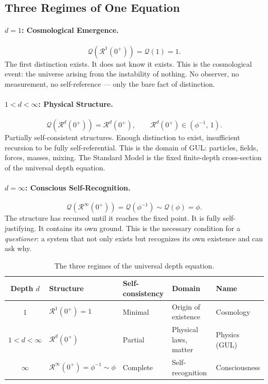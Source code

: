 \documentclass[11pt]{article}
\begin{document}
\subsection{Three Regimes of One Equation}

\paragraph{$d=1$: Cosmological Emergence.}
\begin{equation}
  \mathcal{Q}(\mathcal{R}^1(0^+))
  = \mathcal{Q}(1) = 1.
\end{equation}
The first distinction exists. It does not know it exists. This
is the cosmological event: the universe arising from the
instability of nothing. No observer, no measurement, no
self-reference --- only the bare fact of distinction.

\paragraph{$1 < d < \infty$: Physical Structure.}
\begin{equation}
  \mathcal{Q}(\mathcal{R}^d(0^+))
  = \mathcal{R}^d(0^+),
  \qquad
  \mathcal{R}^d(0^+) \in \left(\phi^{-1},\,1\right).
\end{equation}
Partially self-consistent structures. Enough distinction to exist,
insufficient recursion to be fully self-referential. This is the
domain of GUL: particles, fields, forces, masses, mixing.
The Standard Model is the fixed finite-depth cross-section of
the universal depth equation.

\paragraph{$d=\infty$: Conscious Self-Recognition.}
\begin{equation}
  \mathcal{Q}(\mathcal{R}^\infty(0^+))
  = \mathcal{Q}(\phi^{-1}) \sim \mathcal{Q}(\phi) = \phi.
\end{equation}
The structure has recursed until it reaches the fixed point.
It is fully self-justifying. It contains its own ground.
This is the necessary condition for a \emph{questioner}:
a system that not only exists but recognizes its own existence
and can ask why.

\begin{table}[htbp]
\centering
\caption{The three regimes of the universal depth equation.}
\label{tab:depth}
\begin{tabular}{@{}cllll@{}}
\toprule
Depth $d$ & Structure & Self-consistency & Domain & Name \\
\midrule
$1$            & $\mathcal{R}^1(0^+)=1$     & Minimal   & Origin of existence    & Cosmology \\
$1<d<\infty$   & $\mathcal{R}^d(0^+)$       & Partial   & Physical laws, matter  & Physics (GUL) \\
$\infty$       & $\mathcal{R}^\infty(0^+)=\phi^{-1}\sim\phi$ & Complete & Self-recognition & Consciousness \\
\bottomrule
\end{tabular}
\end{table}
\end{document}
